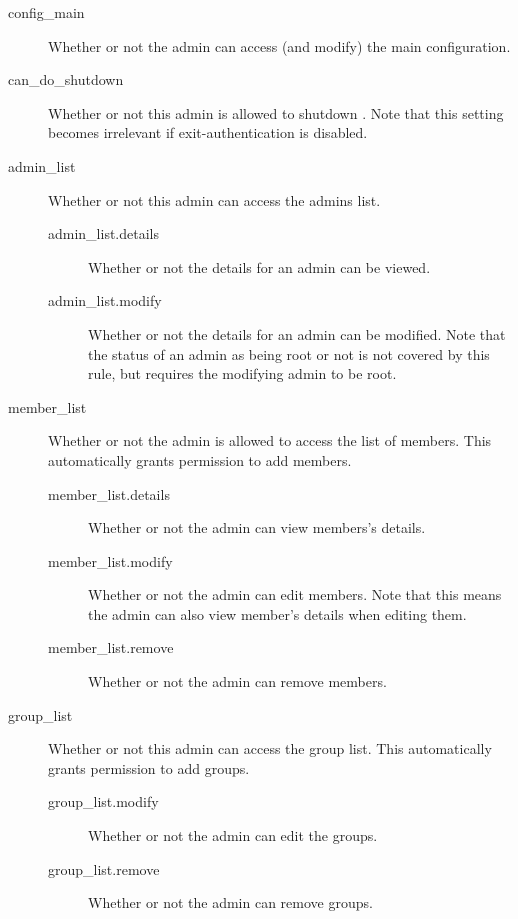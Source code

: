     \begin{description}
        \item [config\_main] Whether or not the admin can access (and modify) the main configuration.
    
        \item [can\_do\_shutdown] Whether or not this admin is allowed to shutdown \srl. Note that this setting becomes irrelevant if exit-authentication is disabled.
        
        \item [admin\_list] Whether or not this admin can access the admins list.
        \begin{description}
            \item [admin\_list.details] Whether or not the details for an admin
                    can be viewed.
            \item [admin\_list.modify] Whether or not the details for an admin
                    can be modified. Note that the status of an admin as being
                    root or not is not covered by this rule, but requires the
                    modifying admin to be root.
        \end{description}
        
        \item [member\_list] Whether or not the admin is allowed to access the list of members. This automatically grants permission to add members.
        \begin{description}
            \item [member\_list.details] Whether or not the admin can view members's details.
            \item [member\_list.modify] Whether or not the admin can edit members. Note that this means the admin can also view member's details when editing them.
            \item [member\_list.remove] Whether or not the admin can remove members.
        \end{description}
        
        \item [group\_list] Whether or not this admin can access the group list. This automatically grants permission to add groups.
        \begin{description}
            \item [group\_list.modify] Whether or not the admin can edit the groups.
            \item [group\_list.remove] Whether or not the admin can remove groups.
        \end{description}
        

\end{description}
